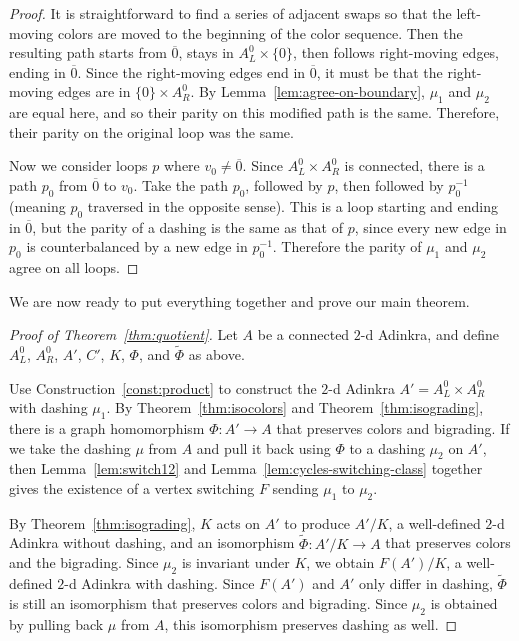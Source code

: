 \documentclass[12pt,twoside,singlespace]{article}
\numberwithin{equation}{section}
\theoremstyle{definition}
\begin{document}
\begin{proof}
It is straightforward to find a series of adjacent swaps so that the left-moving colors are moved to the beginning of the color sequence.  Then the resulting path starts from $\overline{0}$, stays in $A_L^0\times\{0\}$, then follows right-moving edges, ending in $\overline{0}$.  Since the right-moving edges end in $\overline{0}$, it must be that the right-moving edges are in $\{0\}\times A_R^0$.  By Lemma~\ref{lem:agree-on-boundary}, $\mu_1$ and $\mu_2$ are equal here, and so their parity on this modified path is the same.  Therefore, their parity on the original loop was the same.

Now we consider loops $p$ where $v_0\not=\overline{0}$.  Since $A_L^0\times A_R^0$ is connected, there is a path $p_0$ from $\overline{0}$ to $v_0$.  Take the path $p_0$, followed by $p$, then followed by $p_0^{-1}$ (meaning $p_0$ traversed in the opposite sense).  This is a loop starting and ending in $\overline{0}$, but the parity of a dashing is the same as that of $p$, since every new edge in $p_0$ is counterbalanced by a new edge in $p_0^{-1}$.  Therefore the parity of $\mu_1$ and $\mu_2$ agree on all loops.
\end{proof}

We are now ready to put everything together and prove our main theorem.

\begin{proof}[Proof of Theorem~\ref{thm:quotient}]
Let $A$ be a connected $2$-d Adinkra, and define $A_L^0$, $A_R^0$, $A'$, $C'$, $K$, $\Phi$, and $\tilde{\Phi}$ as above.

Use Construction~\ref{const:product} to construct the $2$-d Adinkra $A'=A_L^0\times A_R^0$ with dashing $\mu_1$.
By Theorem~\ref{thm:isocolors} and Theorem~\ref{thm:isograding}, there is a graph homomorphism $\Phi:A' \to A$ that preserves colors and bigrading.  If we take the dashing $\mu$ from $A$ and pull it back using $\Phi$ to a dashing $\mu_2$ on $A'$, then Lemma~\ref{lem:switch12} and Lemma~\ref{lem:cycles-switching-class} together gives the existence of a vertex switching $F$ sending $\mu_1$ to $\mu_2$.

By Theorem~\ref{thm:isograding}, $K$ acts on $A'$ to produce $A'/K$, a well-defined $2$-d Adinkra without dashing, and an isomorphism $\tilde{\Phi}:A'/K\to A$ that preserves colors and the bigrading.  Since $\mu_2$ is invariant under $K$, we obtain  $F(A')/K$, a well-defined $2$-d Adinkra with dashing. Since $F(A')$ and $A'$ only differ in dashing, $\tilde{\Phi}$ is still an isomorphism that preserves colors and bigrading.  Since $\mu_2$ is obtained by pulling back $\mu$ from $A$, this isomorphism preserves dashing as well.
\end{proof}
\end{document}
